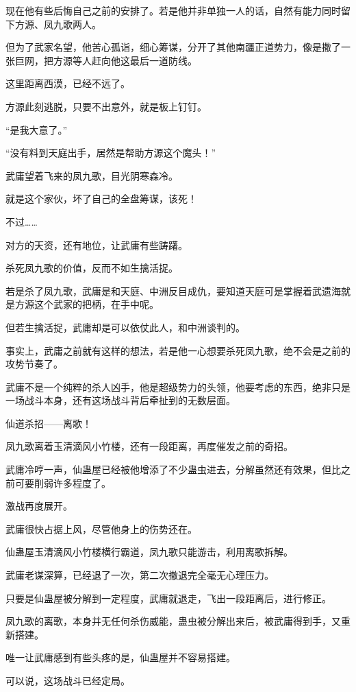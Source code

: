 \begin{this_body}
现在他有些后悔自己之前的安排了。若是他并非单独一人的话，自然有能力同时留下方源、凤九歌两人。

但为了武家名望，他苦心孤诣，细心筹谋，分开了其他南疆正道势力，像是撒了一张巨网，把方源等人赶向他这最后一道防线。

这里距离西漠，已经不远了。

方源此刻逃脱，只要不出意外，就是板上钉钉。

“是我大意了。”

“没有料到天庭出手，居然是帮助方源这个魔头！”

武庸望着飞来的凤九歌，目光阴寒森冷。

就是这个家伙，坏了自己的全盘筹谋，该死！

不过……

对方的天资，还有地位，让武庸有些踌躇。

杀死凤九歌的价值，反而不如生擒活捉。

若是杀了凤九歌，武庸是和天庭、中洲反目成仇，要知道天庭可是掌握着武遗海就是方源这个武家的把柄，在手中呢。

但若生擒活捉，武庸却是可以依仗此人，和中洲谈判的。

事实上，武庸之前就有这样的想法，若是他一心想要杀死凤九歌，绝不会是之前的攻势节奏了。

武庸不是一个纯粹的杀人凶手，他是超级势力的头领，他要考虑的东西，绝非只是一场战斗本身，还有这场战斗背后牵扯到的无数层面。

仙道杀招——离歌！

凤九歌离着玉清滴风小竹楼，还有一段距离，再度催发之前的奇招。

武庸冷哼一声，仙蛊屋已经被他增添了不少蛊虫进去，分解虽然还有效果，但比之前可要削弱许多程度了。

激战再度展开。

武庸很快占据上风，尽管他身上的伤势还在。

仙蛊屋玉清滴风小竹楼横行霸道，凤九歌只能游击，利用离歌拆解。

武庸老谋深算，已经退了一次，第二次撤退完全毫无心理压力。

只要是仙蛊屋被分解到一定程度，武庸就退走，飞出一段距离后，进行修正。

凤九歌的离歌，本身并无任何杀伤威能，蛊虫被分解出来后，被武庸得到手，又重新搭建。

唯一让武庸感到有些头疼的是，仙蛊屋并不容易搭建。

可以说，这场战斗已经定局。


\end{this_body}
